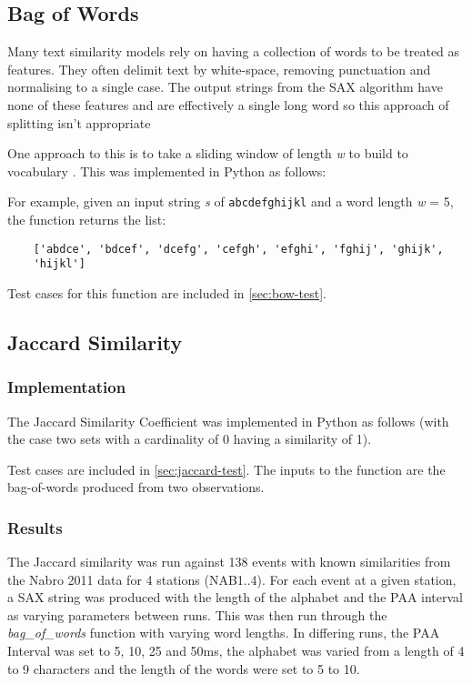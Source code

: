 \documentclass[../report.tex]{subfiles}
\begin{document}
\subsection{Bag of Words} \label{sec:bow}
	Many text similarity models rely on having a collection of words to be treated as features.  They often delimit text by white-space, removing punctuation and normalising to a single case.  The output strings from the SAX algorithm have none of these features and are effectively a single long word so this approach of splitting isn't appropriate
	
	One approach to this is to take a sliding window of length \textit{w} to build to vocabulary \citep{sax-hot}.  This was implemented in Python as follows:



	For example, given an input string \textit{s} of \verb|abcdefghijkl| and a word length \textit{w} = 5, the function returns the list: 
\begin{verbatim}
	['abdce', 'bdcef', 'dcefg', 'cefgh', 'efghi', 'fghij', 'ghijk', 
	'hijkl']
\end{verbatim}

	Test cases for this function are included in \cref{sec:bow-test}.


\subsection{Jaccard Similarity} \label{sec:jaccard}
\subsubsection{Implementation}
	The Jaccard Similarity Coefficient was implemented in Python as follows (with the case two sets with a cardinality of 0 having a similarity of 1).



	Test cases are included in \cref{sec:jaccard-test}.  The inputs to the function are the bag-of-words produced from two observations.
	
\subsubsection{Results}

	The Jaccard similarity was run against 138 events with known similarities from the Nabro 2011 data for 4 stations (NAB1..4).  For each event at a given station, a SAX string was produced with the length of the alphabet and the PAA interval as varying parameters between runs.  This was then run through the \textit{bag\_of\_words} function with varying word lengths.  In differing runs, the PAA Interval was set to 5, 10, 25 and 50ms, the alphabet was varied from a length of 4 to 9 characters and the length of the words were set to 5 to 10.
	
\end{document}
